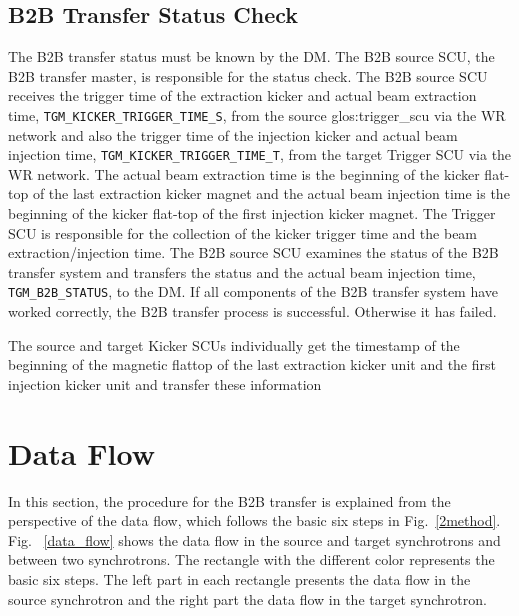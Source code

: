%

\subsection{B2B Transfer Status Check}
The B2B transfer status must be known by the DM. The B2B source SCU, the B2B transfer master, is responsible for the status check. The B2B source SCU receives the trigger time of the extraction kicker and actual beam extraction time, \verb|TGM_KICKER_TRIGGER_TIME_S|, from the source \gls{glos:trigger_scu} via the WR network and also the trigger time of the injection kicker and actual beam injection time, \verb|TGM_KICKER_TRIGGER_TIME_T|, from the target Trigger SCU via the WR network. The actual beam extraction time is the beginning of the kicker flat-top of the last extraction kicker magnet and the actual beam injection time is the beginning of the kicker flat-top of the first injection kicker magnet. The Trigger SCU is responsible for the collection of the kicker trigger time and the beam extraction/injection time. The B2B source SCU examines the status of the B2B transfer system and transfers the status and the actual beam injection time, \verb|TGM_B2B_STATUS|, to the DM. If all components of the B2B transfer system have worked correctly, the B2B transfer process is successful. Otherwise it has failed. 

The source and target Kicker SCUs
individually get the timestamp of the beginning of the magnetic flattop of the last
extraction kicker unit and the first injection kicker unit and transfer these information
\section{Data Flow}
In this section, the procedure for the B2B transfer is explained from the perspective of the data flow, which follows the basic six steps in Fig.~\ref{2method}. Fig. ~\ref{data_flow} shows the data flow in the source and target synchrotrons and between two synchrotrons. The rectangle with the different color represents the basic six steps. The left part in each rectangle presents the data flow in the source synchrotron and the right part the data flow in the target synchrotron.


